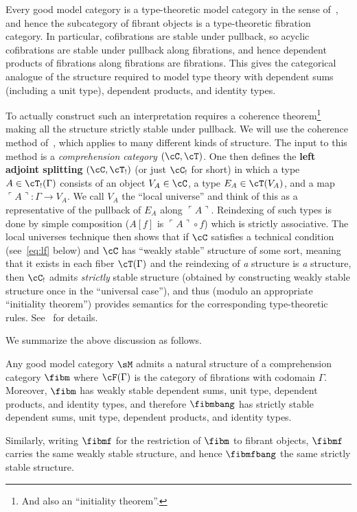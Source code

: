 \documentclass{amsart}
\def\name#1{\ulcorner #1\urcorner}
\let\C\cC
\let\T\cT
\begin{document}
Every good model category is a type-theoretic model category in the sense of~\cite{shulman:invdia}, and hence the subcategory of fibrant objects is a type-theoretic fibration category.
In particular, cofibrations are stable under pullback, so acyclic cofibrations are stable under pullback along fibrations, and hence dependent products of fibrations along fibrations are fibrations.
This gives the categorical analogue of the structure required to model type theory with dependent sums (including a unit type), dependent products, and identity types.

To actually construct such an interpretation requires a coherence theorem\footnote{And also an ``initiality theorem''.} making all the structure strictly stable under pullback.
We will use the coherence method of~\cite{lw:localuniv}, which applies to many different kinds of structure.
The input to this method is a \emph{comprehension category} $(\C,\T)$.
One then defines the \textbf{left adjoint splitting} $(\C,\T_!)$ (or just $\C_!$ for short) in which a type $A\in \T_!(\Gamma)$ consists of an object $V_A\in\C$, a type $E_A\in\T(V_A)$, and a map $\name{A}:\Gamma\to V_A$.
We call $V_A$ the ``local universe'' and think of this as a representative of the pullback of $E_A$ along $\name{A}$.
Reindexing of such types is done by simple composition ($A[f]$ is $\name{A}\circ f$) which is strictly associative.
The local universes technique then shows that if $\C$ satisfies a technical condition (see~\eqref{eq:lf} below) and $\C$ has ``weakly stable'' structure of some sort, meaning that it exists in each fiber $\T(\Gamma)$ and the reindexing of \emph{a} structure is \emph{a} structure, then $\C_!$ admits \emph{strictly} stable structure (obtained by constructing weakly stable structure once in the ``universal case''), and thus (modulo an appropriate ``initiality theorem'') provides semantics for the corresponding type-theoretic rules.
See~\cite{lw:localuniv} for details.

We summarize the above discussion as follows.

\begin{thm}\label{thm:gmc-tt}
  Any good model category $\sM$ admits a natural structure of a comprehension category $\fibm$ where $\cF(\Gamma)$ is the category of fibrations with codomain $\Gamma$.
  Moreover, $\fibm$ has weakly stable dependent sums, unit type, dependent products, and identity types, and therefore $\fibmbang$ has strictly stable dependent sums, unit type, dependent products, and identity types.

  Similarly, writing $\fibmf$ for the restriction of $\fibm$ to fibrant objects, $\fibmf$ carries the same weakly stable structure, and hence $\fibmfbang$ the same strictly stable structure.
\end{thm}
\end{document}
